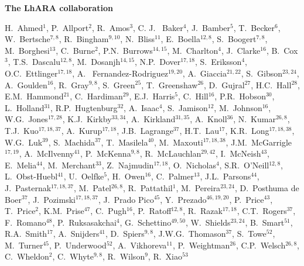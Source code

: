 \vspace{0.75cm}
\begin{center}
  {\bf \color{BlueViolet} The LhARA collaboration} \\
  \vspace{0.25cm}
\end{center}
\begin{center}
  H.~Ahmed$^{1}$,
  P.~Allport$^{2}$,
  R.~Amos$^{3}$,
  C. J. ~Baker$^{4}$,
  J.~Bamber$^{5}$,
  T.~Becker$^{6}$,
  W.~Bertsche$^{7,8}$,
  R.~Bingham$^{9,10}$,
  N.~Bliss$^{11}$,
  E.~Boella$^{12,8}$,
  S.~Boogert$^{7,8}$,
  M.~Borghesi$^{13}$,
  C.~Burne$^{2}$,
  P.N.~Burrows$^{14,15}$,
  M.~Charlton$^{4}$,
  J.~Clarke$^{16}$,
  B.~Cox$^{3}$,
  T.S.~Dascalu$^{12,8}$,
  M.~Dosanjh$^{14,15}$,
  N.P.~Dover$^{17,18}$,
  S.~Eriksson$^{4}$,
  O.C.~Ettlinger$^{17,18}$,
  A. ~Fernandez-Rodriguez$^{19,20}$,
  A.~Giaccia$^{21,22}$,
  S.~Gibson$^{23,24}$,
  A.~Goulden$^{16}$,
  R.~Gray$^{9,8}$,
  S.~Green$^{25}$,
  T.~Greenshaw$^{26}$,
  D.~Gujral$^{27}$,
  H.C.~Hall$^{28}$,
  E.M.~Hammond$^{21}$,
  C.~Hardiman$^{29}$,
  E.J.~Harris$^{5}$,
  C.~Hill$^{16}$,
  P.R.~Hobson$^{30}$,
  L.~Holland$^{31}$,
  R.P.~Hugtenburg$^{32}$,
  A.~Isaac$^{4}$,
  S.~Jamison$^{12}$,
  M.~Johnson$^{16}$,
  W.G.~Jones$^{17,28}$,
  K.J.~Kirkby$^{33,34}$,
  A.~Kirkland$^{31,35}$,
  A.~Knoll$^{36}$,
  N.~Kumar$^{26,8}$,
  T.J.~Kuo$^{17,18,37}$,
  A.~Kurup$^{17,18}$,
  J.B.~Lagrange$^{37}$,
  H.T.~Lau$^{17}$,
  K.R.~Long$^{17,18,38}$,
  W.G.~Luk$^{39}$,
  S.~Machida$^{37}$,
  T.~Masilela$^{40}$,
  M.~Maxouti$^{17,18,38}$,
  J.M.~McGarrigle$^{17,19}$,
  A.~McIlvenny$^{41}$,
  P.~McKenna$^{9,8}$,
  R.~McLauchlan$^{29,42}$,
  I.~McNeish$^{43}$,
  E.~Melia$^{44}$,
  M.~Merchant$^{33}$,
  Z.~Najmudin$^{17,18}$,
  O.~Nicholas$^{4}$,
  S.R.~O'Neill$^{12,8}$,
  L.~Obst-Huebl$^{41}$,
  U.~Oelfke$^{5}$,
  H.~Owen$^{16}$,
  C.~Palmer$^{13}$,
  J.L.~Parsons$^{44}$,
  J.~Pasternak$^{17,18,37}$,
  M.~Patel$^{26,8}$,
  R.~Pattathil$^{1}$,
  M.~Pereira$^{23,24}$,
  D.~Posthuma de Boer$^{37}$,
  J.~Pozimski$^{17,18,37}$,
  J.~Prado Pico$^{45}$,
  Y.~Prezado$^{46,19,20}$,
  P.~Price$^{43}$,
  T.~Price$^{2}$,
  K.M.~Prise$^{47}$,
  C.~Pugh$^{16}$,
  P.~Ratoff$^{12,8}$,
  R.~Razak$^{17,18}$,
  C.T.~Rogers$^{37}$,
  F.~Romano$^{48}$,
  P.~Ruksasakchai$^{4}$,
  G.~Schettino$^{49,50}$,
  W.~Shields$^{23,24}$,
  B.~Smart$^{51}$,
  R.A.~Smith$^{17}$,
  A.~Snijders$^{41}$,
  D.~Spiers$^{9,8}$,
  J.W.G.~Thomason$^{37}$,
  S.~Towe$^{52}$,
  M.~Turner$^{45}$,
  P.~Underwood$^{52}$,
  A.~Vikhoreva$^{11}$,
  P.~Weightman$^{26}$,
  C.P.~Welsch$^{26,8}$,
  C.~Wheldon$^{2}$,
  C.~Whyte$^{9,8}$,
  R.~Wilson$^{9}$,
  R.~Xiao$^{53}$
\end{center}
